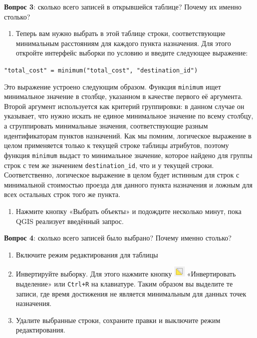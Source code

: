 \documentclass[
  12pt,
]{book}
\providecommand{\tightlist}{%
  \setlength{\itemsep}{0pt}\setlength{\parskip}{0pt}}
\begin{document}
\textbf{Вопрос 3}: сколько всего записей в открывшейся таблице? Почему их именно столько?

\begin{enumerate}
\def\labelenumi{\arabic{enumi}.}
\setcounter{enumi}{4}
\tightlist
\item
  Теперь вам нужно выбрать в этой таблице строки, соответствующие минимальным расстояниям для каждого пункта назначения. Для этого откройте интерфейс выборки по условию и введите следующее выражение:
\end{enumerate}

\texttt{"total\_cost"\ =\ minimum("total\_cost",\ "destination\_id")}

Это выражение устроено следующим образом. Функция \texttt{minimum} ищет минимальное значение в столбце, указанном в качестве первого её аргумента. Второй аргумент используется как критерий группировки: в данном случае он указывает, что нужно искать не единое минимальное значение по всему столбцу, а сгруппировать минимальные значения, соответствующие разным идентификаторам пунктов назначений. Как мы помним, логическое выражение в целом применяется только к текущей строке таблицы атрибутов, поэтому функция \texttt{minimum} выдаст то минимальное значение, которое найдено для группы строк с тем же значением \texttt{destination\_id}, что и у текущей строки. Соответственно, логическое выражение в целом будет истинным для строк с минимальной стоимостью проезда для данного пункта назначения и ложным для всех остальных строк того же пункта.

\begin{enumerate}
\def\labelenumi{\arabic{enumi}.}
\setcounter{enumi}{5}
\tightlist
\item
  Нажмите кнопку «Выбрать объекты» и подождите несколько минут, пока QGIS реализует введённый запрос.
\end{enumerate}

\textbf{Вопрос 4}: сколько всего записей было выбрано? Почему именно столько?

\begin{enumerate}
\def\labelenumi{\arabic{enumi}.}
\setcounter{enumi}{6}
\item
  Включите режим редактирования для таблицы
\item
  Инвертируйте выборку. Для этого нажмите кнопку \includegraphics{images/Ex11_RoadNetwork/button_invertsSelection.png} «Инвертировать выделение» или \texttt{Ctrl+R} на клавиатуре. Таким образом вы выделите те записи, где время достижения не является минимальным для данных точек назначения.
\item
  Удалите выбранные строки, сохраните правки и выключите режим редактирования.
\end{enumerate}
\end{document}
